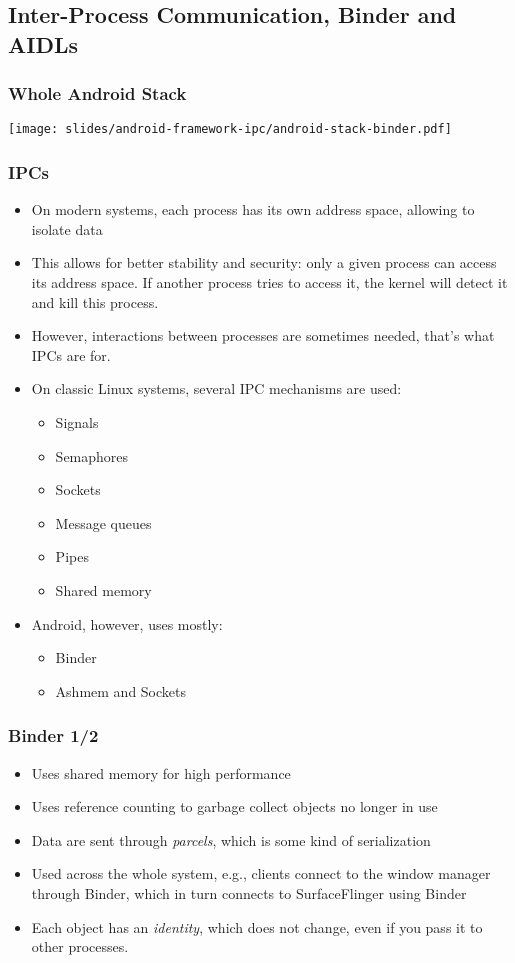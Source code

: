 \subsection[IPCs, Binder and AIDLs]{Inter-Process Communication, Binder and AIDLs}

\begin{frame}
  \frametitle{Whole Android Stack}
  \begin{center}
    \texttt{[image: slides/android-framework-ipc/android-stack-binder.pdf]}
  \end{center}
\end{frame}

\begin{frame}
  \frametitle{IPCs}
  \begin{itemize}
  \item On modern systems, each process has its own address space,
    allowing to isolate data
  \item This allows for better stability and security: only a given
    process can access its address space. If another process tries to
    access it, the kernel will detect it and kill this process.
  \item However, interactions between processes are sometimes needed,
    that's what IPCs are for.
  \item On classic Linux systems, several IPC mechanisms are used:
    \begin{itemize}
    \item Signals
    \item Semaphores
    \item Sockets
    \item Message queues
    \item Pipes
    \item Shared memory
    \end{itemize}
  \item Android, however, uses mostly:
    \begin{itemize}
    \item Binder
    \item Ashmem and Sockets
    \end{itemize}
  \end{itemize}
\end{frame}

\begin{frame}
  \frametitle{Binder 1/2}
  \begin{itemize}
  \item Uses shared memory for high performance
  \item Uses reference counting to garbage collect objects no longer
    in use
  \item Data are sent through \emph{parcels}, which is some kind of
    serialization
  \item Used across the whole system, e.g., clients connect to the
    window manager through Binder, which in turn connects to
    SurfaceFlinger using Binder
  \item Each object has an \emph{identity}, which does not change,
    even if you pass it to other processes.
  \end{itemize}
\end{frame}

